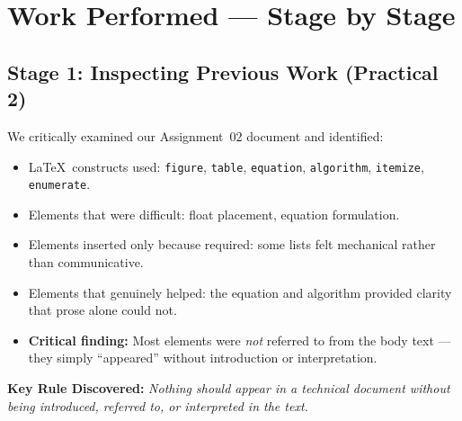 \documentclass[11pt, a4paper]{article}
\begin{document}
\section{Work Performed --- Stage by Stage}

\subsection{Stage 1: Inspecting Previous Work (Practical 2)}
We critically examined our Assignment~02 document and identified:
\begin{itemize}[nosep]
    \item \LaTeX\ constructs used: \texttt{figure}, \texttt{table}, \texttt{equation}, \texttt{algorithm}, \texttt{itemize}, \texttt{enumerate}.
    \item Elements that were difficult: float placement, equation formulation.
    \item Elements inserted only because required: some lists felt mechanical rather than communicative.
    \item Elements that genuinely helped: the equation and algorithm provided clarity that prose alone could not.
    \item \textbf{Critical finding:} Most elements were \emph{not} referred to from the body text --- they simply ``appeared'' without introduction or interpretation.
\end{itemize}

\noindent\textbf{Key Rule Discovered:} \textit{Nothing should appear in a technical document without being introduced, referred to, or interpreted in the text.}
\end{document}
